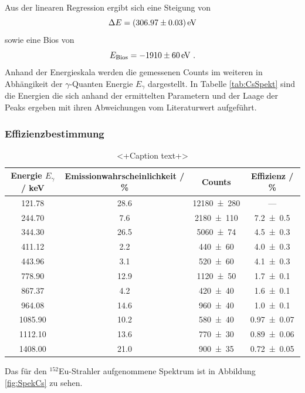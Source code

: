 Aus der linearen Regression ergibt sich eine Steigung von  
\begin{equation}
  \Delta E = (\num{306.97 +- 0.03}) \, \text{eV}
  \label{eqn:Reg}
\end{equation}
sowie eine Bios von 
\begin{equation}
  E_\text{Bios} = \num{-1910 +- 60} \, \text{eV} \ .
  \label{eqn:Bios}
\end{equation}
Anhand der Energieskala werden die gemessenen Counts im weiteren in Abhängikeit der $\gamma$-Quanten Energie $E_{\gamma}$ dargestellt. In Tabelle \ref{tab:CsSpekt} sind die Energien die sich anhand der ermittelten Parametern und der Laage der Peaks ergeben mit ihren Abweichungen vom Literaturwert aufgeführt.


\subsubsection{Effizienzbestimmung}
\label{sec:Q}
\begin{table}
  \centering
  \begin{tabular}{c| c c c}
     \toprule
    	Energie $E_{\gamma}$ / keV& Emissionwahrscheinlichkeit / \% & Counts & Effizienz / \% \\
     \midrule
     121.78  &28.6 &\num{12180 +- 280} 	& ---	\\
     244.70  &7.6  &\num{2180 +- 110} 	& \num{7.2 +- 0.5}	\\
     344.30  &26.5 &\num{5060 +- 74} 	& \num{4.5 +- 0.3} 	\\
     411.12  &2.2  &\num{440 +- 60} 	& \num{4.0 +- 0.3} 	\\
     443.96  &3.1  &\num{520 +- 60} 	& \num{4.1 +- 0.3} 	\\
     778.90  &12.9 &\num{1120 +- 50}	& \num{1.7 +- 0.1}	\\
     867.37  &4.2  &\num{420 +- 40} 	& \num{1.6 +- 0.1}	\\
     964.08  &14.6 &\num{960 +- 40} 	& \num{1.0 +- 0.1}	\\
     1085.90 &10.2 &\num{580 +- 40} 	& \num{0.97 +- 0.07}	\\
     1112.10 &13.6 &\num{770 +- 30} 	& \num{0.89 +- 0.06}	\\
     1408.00 &21.0 &\num{900 +- 35} 	& \num{0.72 +- 0.05}	\\
     \bottomrule
  \end{tabular}
  \caption{<+Caption text+>}
  \label{tab:<+label+>}
\end{table}
Das für den $^{152}$Eu-Strahler aufgenommene Spektrum ist in Abbildung \ref{fig:SpekCs} zu sehen.
